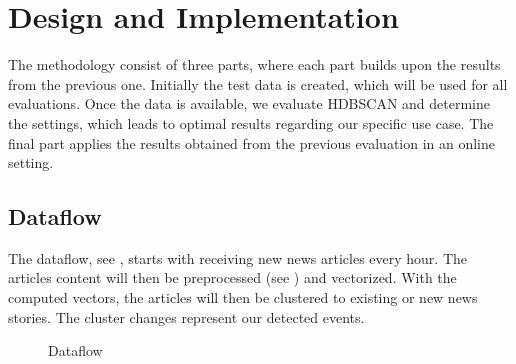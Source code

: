 \section{Design and Implementation}
\label{sec:4_design_and_implementation}

The methodology consist of three parts, where each part builds upon the results from the previous one.
Initially the test data is created, which will be used for all evaluations.
Once the data is available, we evaluate HDBSCAN and determine the settings,
which leads to optimal results regarding our specific use case.
The final part applies the results obtained from the previous evaluation in an online setting.

\subsection{Dataflow}
\label{subsec:4_dataflow}

The dataflow, see , starts with receiving new news articles every hour.
The articles content will then be preprocessed (see )
and vectorized.
With the computed vectors, the articles will then be clustered to existing or new news stories.
The cluster changes represent our detected events.

\begin{figure}[!htb]
    \centering

    \caption{Dataflow}
    \label{fig:dataflow}
\end{figure}




